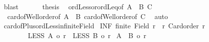 \begin{isabellebody}
\ blast\isanewline
\ \ \isacommand{{\isacharbraceright}{\kern0pt}}\isamarkupfalse%
\isanewline
\ \ \isamarkupfalse%
\ {\isacharquery}{\kern0pt}thesis\ \isamarkupfalse%
\ ordLess{\isacharunderscore}{\kern0pt}or{\isacharunderscore}{\kern0pt}ordLeq{\isacharbrackleft}{\kern0pt}of\ {\isachardoublequoteopen}{\isacharbar}{\kern0pt}A\ {\isacharless}{\kern0pt}{\isacharplus}{\kern0pt}{\isachargreater}{\kern0pt}\ B{\isacharbar}{\kern0pt}{\isachardoublequoteclose}\ {\isachardoublequoteopen}{\isacharbar}{\kern0pt}C{\isacharbar}{\kern0pt}{\isachardoublequoteclose}{\isacharbrackright}{\kern0pt}\isanewline
\ \ card{\isacharunderscore}{\kern0pt}of{\isacharunderscore}{\kern0pt}Well{\isacharunderscore}{\kern0pt}order{\isacharbrackleft}{\kern0pt}of\ {\isachardoublequoteopen}A\ {\isacharless}{\kern0pt}{\isacharplus}{\kern0pt}{\isachargreater}{\kern0pt}\ B{\isachardoublequoteclose}{\isacharbrackright}{\kern0pt}\ card{\isacharunderscore}{\kern0pt}of{\isacharunderscore}{\kern0pt}Well{\isacharunderscore}{\kern0pt}order{\isacharbrackleft}{\kern0pt}of\ {\isachardoublequoteopen}C{\isachardoublequoteclose}{\isacharbrackright}{\kern0pt}\ \isamarkupfalse%
\ auto\isanewline
{}\isamarkupfalse%
%
\endisatagproof
{\isafoldproof}%
%
\isadelimproof
\isanewline
%
\endisadelimproof
\isanewline
{}\isamarkupfalse%
\ card{\isacharunderscore}{\kern0pt}of{\isacharunderscore}{\kern0pt}Plus{\isacharunderscore}{\kern0pt}ordLess{\isacharunderscore}{\kern0pt}infinite{\isacharunderscore}{\kern0pt}Field{\isacharcolon}{\kern0pt}\isanewline
{}\ INF{\isacharcolon}{\kern0pt}\ {\isachardoublequoteopen}{\isasymnot}finite\ {\isacharparenleft}{\kern0pt}Field\ r{\isacharparenright}{\kern0pt}{\isachardoublequoteclose}\ \ r{\isacharcolon}{\kern0pt}\ {\isachardoublequoteopen}Card{\isacharunderscore}{\kern0pt}order\ r{\isachardoublequoteclose}\ \isanewline
\ \ \ \ \ \ \ \ LESS{}{\isacharcolon}{\kern0pt}\ {\isachardoublequoteopen}{\isacharbar}{\kern0pt}A{\isacharbar}{\kern0pt}\ {\isacharless}{\kern0pt}o\ r{\isachardoublequoteclose}\ \ LESS{}{\isacharcolon}{\kern0pt}\ {\isachardoublequoteopen}{\isacharbar}{\kern0pt}B{\isacharbar}{\kern0pt}\ {\isacharless}{\kern0pt}o\ r{\isachardoublequoteclose}\isanewline
{}\ {\isachardoublequoteopen}{\isacharbar}{\kern0pt}A\ {\isacharless}{\kern0pt}{\isacharplus}{\kern0pt}{\isachargreater}{\kern0pt}\ B{\isacharbar}{\kern0pt}\ {\isacharless}{\kern0pt}o\ r{\isachardoublequoteclose}\isanewline
%
\isadelimproof

\end{isabellebody}
